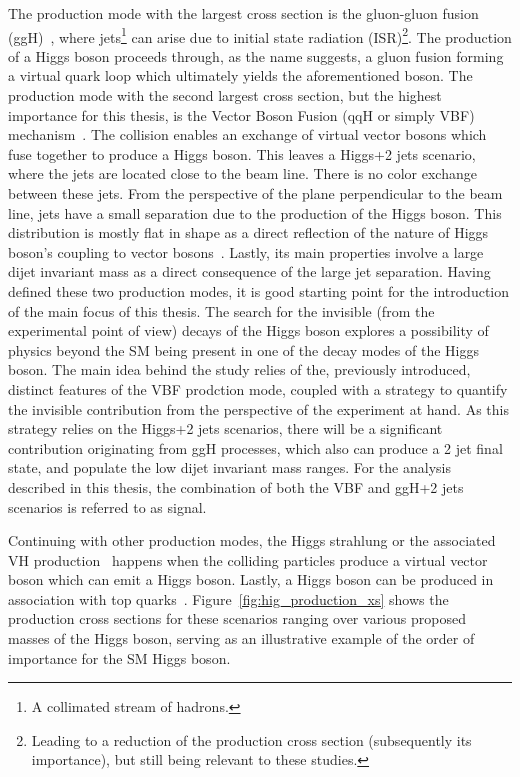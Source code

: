 \hspace{10pt} The production mode with the largest cross section is the gluon-gluon fusion (ggH)~\cite{paper:ggH1,paper:ggH2}, where jets\footnote{A collimated stream of hadrons.} can arise due to initial state radiation (ISR)\footnote{Leading to a reduction of the production cross section (subsequently its importance), but still being relevant to these studies.}. The production of a Higgs boson proceeds through, as the name suggests, a gluon fusion forming a virtual quark loop which ultimately yields the aforementioned boson. The production mode with the second largest cross section, but the highest importance for this thesis, is the Vector Boson Fusion (qqH or simply VBF) mechanism~\cite{paper:ggH1,paper:ggH2,paper:vbf1,paper:vbf2}. The collision enables an exchange of virtual vector bosons which fuse together to produce a Higgs boson. This leaves a Higgs+2 jets scenario, where the jets are located close to the beam line. There is no color exchange between these jets. From the perspective of the plane perpendicular to the beam line, jets have a small separation due to the production of the Higgs boson. This distribution is mostly flat in shape as a direct reflection of the nature of Higgs boson's coupling to vector bosons~\cite{paper:higgs_dphijj}. Lastly, its main properties involve a large dijet invariant mass as a direct consequence of the large jet separation. Having defined these two production modes, it is good starting point for the introduction of the main focus of this thesis.  The search for the invisible (from the experimental point of view) decays of the Higgs boson explores a possibility of physics beyond the SM being present in one of the decay modes of the Higgs boson. The main idea behind the study relies of the, previously introduced, distinct features of the VBF prodction mode, coupled with a strategy to quantify the invisible contribution from the perspective of the experiment at hand. As this strategy relies on the Higgs+2 jets scenarios, there will be a significant contribution originating from ggH processes, which also can produce a 2 jet final state, and populate the low dijet invariant mass ranges. For the analysis described in this thesis, the combination of both the VBF and ggH+2 jets scenarios is referred to as signal.

\hspace{10pt} Continuing with other production modes, the Higgs strahlung or the associated VH production~\cite{paper:vh} happens when the colliding particles produce a virtual vector boson which can emit a Higgs boson. Lastly, a Higgs boson can be produced in association with top quarks~\cite{paper:tth1,paper:tth2}. Figure~\ref{fig:hig_production_xs} shows the production cross sections for these scenarios ranging over various proposed masses of the Higgs boson, serving as an illustrative example of the order of importance for the SM Higgs boson.

